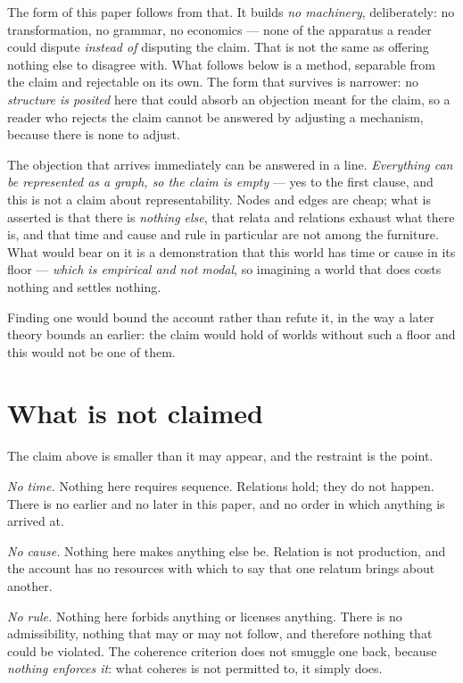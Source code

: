 \documentclass[11pt,a4paper]{article}
\theoremstyle{remark}\newtheorem{remark}[proposition]{Remark}
\begin{document}
The form of this paper follows from that. It builds \emph{no machinery}, deliberately: no
transformation, no grammar, no economics --- none of the apparatus a reader could dispute
\emph{instead of} disputing the claim. That is not the same as offering nothing else to disagree with. What follows below is a method, separable from the
claim and rejectable on its own. The form that survives is narrower: no \emph{structure is
posited} here that could absorb an objection meant for the claim, so a reader who rejects the claim
cannot be answered by adjusting a mechanism, because there is none to adjust.

The objection that arrives immediately can be answered in a line. \emph{Everything can be
represented as a graph, so the claim is empty} --- yes to the first clause, and this is not a claim
about representability. Nodes and edges are cheap; what is asserted is that there is \emph{nothing
else}, that relata and relations exhaust what there is, and that time and cause and rule in
particular are not among the furniture. What would bear on it is a demonstration that this world has
time or cause in its floor --- \emph{which is empirical and not modal}, so imagining a world that does
costs nothing and settles nothing.

Finding one would bound the account rather than refute it, in the way a later theory bounds an earlier:
the claim would hold of worlds without such a floor and this would not be one of them.

\section{What is not claimed}\label{sec:not-claimed}
The claim above is smaller than it may appear, and the restraint is the point.

\emph{No time.} Nothing here requires sequence. Relations hold; they do not happen. There is no earlier
and no later in this paper, and no order in which anything is arrived at.

\emph{No cause.} Nothing here makes anything else be. Relation is not production, and the account has no
resources with which to say that one relatum brings about another.

\emph{No rule.} Nothing here forbids anything or licenses anything. There is no admissibility, nothing
that may or may not follow, and therefore nothing that could be violated. The coherence criterion does
not smuggle one back, because \emph{nothing enforces it}: what coheres is not permitted to, it simply
does.
\end{document}
